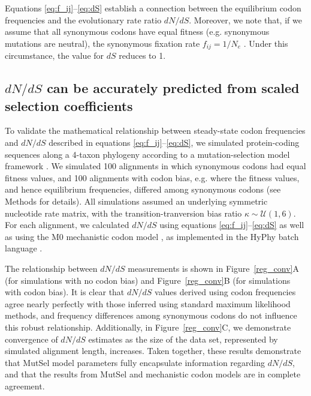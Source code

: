 \documentclass[11pt]{article}
\begin{document}
Equations \eqref{eq:f_ij}--\eqref{eq:dS} establish a connection between the equilibrium codon frequencies and the evolutionary rate ratio $dN/dS$. Moreover, we note that, if we assume that all synonymous codons have equal fitness (e.g. synonymous mutations are neutral), the synonymous fixation rate $f_{ij}= 1/N_e$ \cite{CrowKimura1970}. Under this circumstance, the value for $dS$ reduces to 1.

\subsection*{$dN/dS$ can be accurately predicted from scaled selection coefficients}

To validate the mathematical relationship between steady-state codon frequencies and $dN/dS$ described in equations \eqref{eq:f_ij}--\eqref{eq:dS}, we simulated protein-coding sequences along a 4-taxon phylogeny according to a mutation-selection model framework \cite{HalpernBruno1998,SellaHirsh2005}. We simulated 100 alignments in which synonymous codons had equal fitness values, and 100 alignments with codon bias, e.g. where the fitness values, and hence equilibrium frequencies, differed among synonymous codons (see Methods for details). All simulations assumed an underlying symmetric nucleotide rate matrix, with the transition-tranversion bias ratio $\kappa \sim \mathcal{U}(1,6)$. For each alignment, we calculated $dN/dS$ using equations \eqref{eq:f_ij}--\eqref{eq:dS} as well as using the M0 mechanistic codon model \cite{NielsenYang1998}, as implemented in the HyPhy batch language \cite{KosakovskyPondetal2005}.

The relationship between $dN/dS$ measurements is shown in Figure~\ref{reg_conv}A (for simulations with no codon bias) and Figure~\ref{reg_conv}B (for simulations with codon bias). It is clear that $dN/dS$ values derived using codon frequencies agree nearly perfectly with those inferred using standard maximum likelihood methods, and frequency differences among synonymous codons do not influence this robust relationship. Additionally, in Figure~\ref{reg_conv}C, we demonstrate convergence of $dN/dS$ estimates as the size of the data set, represented by simulated alignment length, increases. Taken together, these results demonstrate that MutSel model parameters fully encapsulate information regarding $dN/dS$, and that the results from MutSel and mechanistic codon models are in complete agreement.
\end{document}
